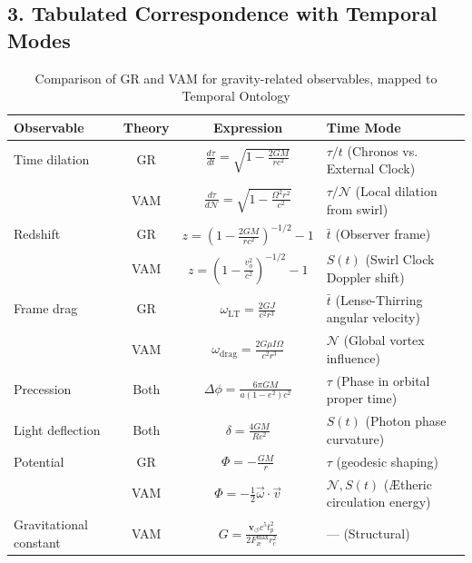 \subsection*{3. Tabulated Correspondence with Temporal Modes}

\begin{table}[ht]
\centering
\caption{Comparison of GR and VAM for gravity-related observables, mapped to Temporal Ontology}
\label{tab:VAM-GR-temporal}
\begin{tabular}{|l|c|c|l|}
\hline
\textbf{Observable} & \textbf{Theory} & \textbf{Expression} & \textbf{Time Mode} \\
\hline
Time dilation &
GR & \( \frac{d\tau}{dt} = \sqrt{1 - \frac{2GM}{rc^2}} \) & \( \tau / t \) (Chronos vs. External Clock) \\
& VAM & \( \frac{d\tau}{d\mathcal{N}} = \sqrt{1 - \frac{\Omega^2 r^2}{c^2}} \) & \( \tau / \mathcal{N} \) (Local dilation from swirl) \\
\hline
Redshift &
GR & \( z = \left(1 - \frac{2GM}{rc^2} \right)^{-1/2} - 1 \) & \( \bar{t} \) (Observer frame) \\
& VAM & \( z = \left(1 - \frac{v_\phi^2}{c^2} \right)^{-1/2} - 1 \) & \( S(t) \) (Swirl Clock Doppler shift) \\
\hline
Frame drag &
GR & \( \omega_{\text{LT}} = \frac{2GJ}{c^2 r^3} \) & \( \bar{t} \) (Lense-Thirring angular velocity) \\
& VAM & \( \omega_{\text{drag}} = \frac{2G \mu I \Omega}{c^2 r^3} \) & \( \mathcal{N} \) (Global vortex influence) \\
\hline
Precession &
Both & \( \Delta\phi = \frac{6\pi GM}{a(1 - e^2)c^2} \) & \( \tau \) (Phase in orbital proper time) \\
\hline
Light deflection &
Both & \( \delta = \frac{4GM}{Rc^2} \) & \( S(t) \) (Photon phase curvature) \\
\hline
Potential &
GR & \( \Phi = -\frac{GM}{r} \) & \( \tau \) (geodesic shaping) \\
& VAM & \( \Phi = -\frac{1}{2} \vec{\omega} \cdot \vec{v} \) & \( \mathcal{N}, S(t) \) (Ætheric circulation energy) \\
\hline
Gravitational constant &
VAM & \( G = \frac{\mathbf{v}_{\scriptscriptstyle\boldsymbol{\circlearrowleft}} c^5 t_p^2}{2 F_{\text{\ae}}^{\text{max}} r_c^2} \) & — (Structural) \\
\hline
\end{tabular}
\end{table}

